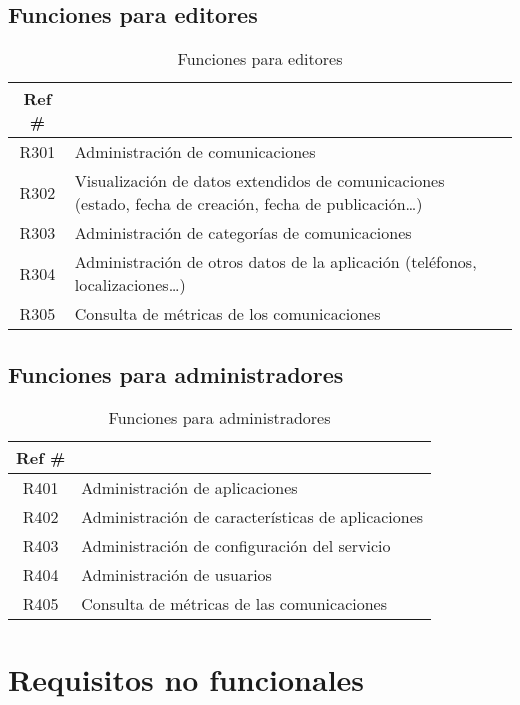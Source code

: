\subsection{Funciones para editores}

\begin{table}[ht]
    \centering
    \begin{tabularx}{\textwidth}{|cX|}
    \rowcolor[HTML]{9B9B9B} 
    {\color[HTML]{FFFFFF} Ref \#} &
      \multicolumn{1}{l}{\cellcolor[HTML]{9B9B9B}{\color[HTML]{FFFFFF} Función}} \\ \hline
    R301\label{R301} & Administración de comunicaciones \\
    R302\label{R302} & Visualización de datos extendidos de comunicaciones (estado, fecha de creación, fecha de publicación\dots) \\
    R303\label{R303} & Administración de categorías de comunicaciones \\
    R304\label{R304} & Administración de otros datos de la aplicación (teléfonos, localizaciones\dots) \\ 
    R305\label{R305} & Consulta de métricas de los comunicaciones \\ 
    \hline
    \end{tabularx}
    \caption{Funciones para editores}
    \label{cuadro:funciones-editores }
\end{table}

\subsection{Funciones para administradores}

\begin{table}[ht]
    \centering
    \begin{tabularx}{\textwidth}{|cX|}
    \rowcolor[HTML]{9B9B9B} 
    {\color[HTML]{FFFFFF} Ref \#} &
      \multicolumn{1}{l}{\cellcolor[HTML]{9B9B9B}{\color[HTML]{FFFFFF} Función}} \\ \hline
    R401\label{R401} & Administración de aplicaciones \\
    R402\label{R402} & Administración de características de aplicaciones \\
    R403\label{R403} & Administración de configuración del servicio \\
    R404\label{R404} & Administración de usuarios \\ 
    R405\label{R405} & Consulta de métricas de las comunicaciones \\ 
    \hline
    \end{tabularx}
    \caption{Funciones para administradores}
    \label{cuadro:funciones-administradores}
\end{table}

\section{Requisitos no funcionales}
